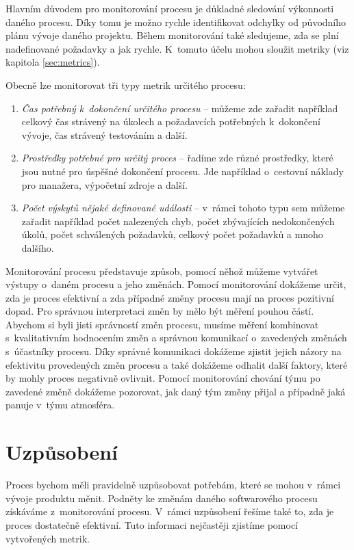 \documentclass[czech,master]{diploma}
\begin{document}
Hlavním důvodem pro monitorování procesu je důkladné sledování výkonnosti daného procesu. Díky tomu je možno rychle identifikovat odchylky od původního plánu vývoje daného projektu. Během monitorování také sledujeme, zda se plní nadefinované požadavky a jak rychle. K~tomuto účelu mohou sloužit metriky (viz kapitola \ref{sec:metrics}).

Obecně lze monitorovat tři typy metrik určitého procesu:

\begin{enumerate}
\item \textit{Čas potřebný k~dokončení určitého procesu} -- můžeme zde zařadit například celkový čas strávený na úkolech a požadavcích potřebných k~dokončení vývoje, čas strávený testováním a další.

\item \textit{Prostředky potřebné pro určitý proces} -- řadíme zde různé prostředky, které jsou nutné pro úspěšné dokončení procesu. Jde například o~cestovní náklady pro manažera, výpočetní zdroje a další.

\item \textit{Počet výskytů nějaké definované události} -- v~rámci tohoto typu sem můžeme zařadit například počet nalezených chyb, počet zbývajících nedokončených úkolů, počet schválených požadavků, celkový počet požadavků a mnoho dalšího.
\end{enumerate}

Monitorování procesu představuje způsob, pomocí něhož můžeme vytvářet výstupy o~daném procesu a jeho změnách. Pomocí monitorování dokážeme určit, zda je proces efektivní a zda případné změny procesu mají na proces pozitivní dopad. Pro správnou interpretaci změn by mělo být měření pouhou částí. Abychom si byli jisti správností změn procesu, musíme měření kombinovat s~kvalitativním hodnocením změn a správnou komunikací o~zavedených změnách s~účastníky procesu. Díky správné komunikaci dokážeme zjistit jejich názory na efektivitu provedených změn procesu a také dokážeme odhalit další faktory, které by mohly proces negativně ovlivnit. Pomocí monitorování chování týmu po zavedené změně dokážeme pozorovat, jak daný tým změny přijal a případně jaká panuje v~týmu atmosféra.

\section{Uzpůsobení}
\label{sec:control}
Proces bychom měli pravidelně uzpůsobovat potřebám, které se mohou v~rámci vývoje produktu měnit. Podněty ke změnám daného softwarového procesu získáváme z~monitorování procesu. V~rámci uzpůsobení řešíme také to, zda je proces dostatečně efektivní. Tuto informaci nejčastěji zjistíme pomocí vytvořených metrik.
\end{document}
